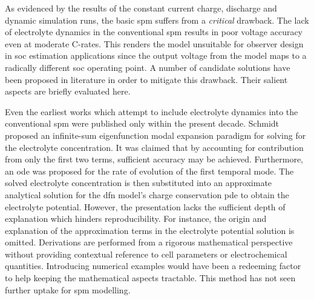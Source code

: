 
As  evidenced by  the  results of  the constant  current  charge, discharge  and
dynamic  simulation runs,  the basic  \gls{spm} suffers  from a  \emph{critical}
drawback. The lack of electrolyte dynamics in the conventional \gls{spm} results
in poor  voltage accuracy  even at  moderate {C-rates}.  This renders  the model
unsuitable for  observer design in  \gls{soc} estimation applications  since the
output voltage from the model maps  to a radically different \gls{soc} operating
point. A number of candidate solutions have been proposed in literature in order
to mitigate this drawback. Their salient aspects are briefly evaluated here.

Even  the earliest  works which  attempt  to include  electrolyte dynamics  into
the  conventional  \gls{spm} were  published  only  within the  present  decade.
Schmidt~\etal~\cite{Schmidt2010c} proposed  an infinite-sum  eigenfunction modal
expansion paradigm for solving for the electrolyte concentration. It was claimed
that by  accounting for contribution from  only the first two  terms, sufficient
accuracy may be achieved. Furthermore, an \gls{ode} was proposed for the rate of
evolution of  the first temporal  mode. The solved electrolyte  concentration is
then  substituted into  an  approximate analytical  solution  for the  \gls{dfn}
model's  charge conservation  \gls{pde}  to obtain the  electrolyte potential. However,  the presentation
lacks the  sufficient depth  of explanation  which hinders  reproducibility. For
instance,  the  origin  and  explanation  of  the  approximation  terms  in  the
electrolyte  potential solution  is omitted.  Derivations are  performed from  a
rigorous mathematical perspective without providing contextual reference to cell
parameters or  electrochemical quantities. Introducing numerical  examples would
have been a redeeming factor to help keeping the mathematical aspects tractable.
This method has not seen further uptake for \gls{spm} modelling.


